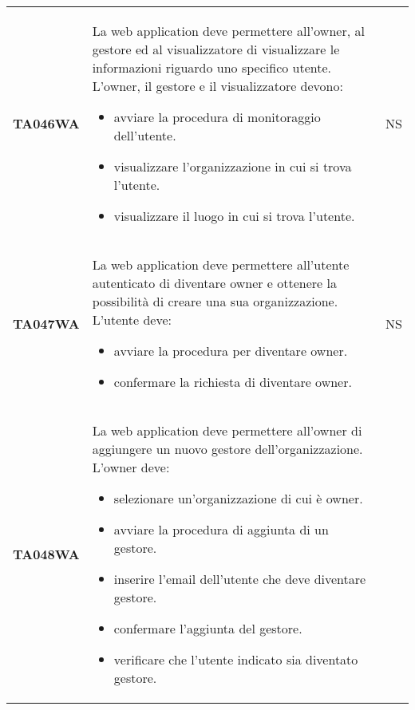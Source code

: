\documentclass[../piano-di-qualifica.tex]{subfiles}
\begin{document}
\begin{longtable}[H]{>{\centering\bfseries}m{3cm} >{}m{10cm} >{\centering\arraybackslash}m{3cm}}
  TA046WA           & La web application deve permettere all'owner, al gestore ed al visualizzatore di visualizzare le informazioni riguardo uno specifico utente. \newline
  L'owner, il gestore e il visualizzatore devono:
  \begin{itemize}
    \item avviare la procedura di monitoraggio dell'utente.
    \item visualizzare l'organizzazione in cui si trova l'utente.
    \item visualizzare il luogo in cui si trova l'utente.
  \end{itemize}
                    & NS                                                                                                                                                                                                                                                               \\
  TA047WA           & La web application deve permettere all'utente autenticato di diventare owner e ottenere la possibilità di creare una sua organizzazione. \newline
  L'utente deve:
  \begin{itemize}
    \item avviare la procedura per diventare owner.
    \item confermare la richiesta di diventare owner.
  \end{itemize}
                    & NS                                                                                                                                                                                                                                                               \\
  TA048WA           & La web application deve permettere all'owner di aggiungere un nuovo gestore dell'organizzazione. \newline
  L'owner deve:
  \begin{itemize}
    \item selezionare un'organizzazione di cui è owner.
    \item avviare la procedura di aggiunta di un gestore.
    \item inserire l'email dell'utente che deve diventare gestore.
    \item confermare l'aggiunta del gestore.
    \item verificare che l'utente indicato sia diventato gestore.
  \end{itemize}

\end{longtable}
\end{document}
